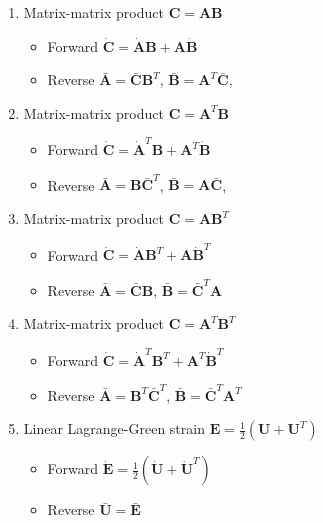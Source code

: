 \documentclass{article}
\begin{document}
\begin{enumerate}

\item Matrix-matrix product $\mathbf{C} = \mathbf{A} \mathbf{B}$
\begin{itemize}
\item Forward $\dot{\mathbf{C}} = \dot{\mathbf{A}} \mathbf{B} + \mathbf{A} \dot{\mathbf{B}}$
\item Reverse $\bar{\mathbf{A}} = \bar{\mathbf{C}} \mathbf{B}^{T}$,  $\bar{\mathbf{B}} = \mathbf{A}^{T} \bar{\mathbf{C}}$,
\end{itemize}

\item Matrix-matrix product $\mathbf{C} = \mathbf{A}^{T} \mathbf{B}$
\begin{itemize}
\item Forward $\dot{\mathbf{C}} = \dot{\mathbf{A}}^{T} \mathbf{B} + \mathbf{A}^{T} \dot{\mathbf{B}}$
\item Reverse $\bar{\mathbf{A}} = \mathbf{B} \bar{\mathbf{C}}^{T}$,  $\bar{\mathbf{B}} = \mathbf{A} \bar{\mathbf{C}}$,
\end{itemize}

\item Matrix-matrix product $\mathbf{C} = \mathbf{A} \mathbf{B}^{T}$
\begin{itemize}
\item Forward $\dot{\mathbf{C}} = \dot{\mathbf{A}} \mathbf{B}^{T} + \mathbf{A} \dot{\mathbf{B}}^{T}$
\item Reverse $\bar{\mathbf{A}} = \bar{\mathbf{C}} \mathbf{B}$, $\bar{\mathbf{B}} = \bar{\mathbf{C}}^{T} \mathbf{A}$
\end{itemize}

\item Matrix-matrix product $\mathbf{C} = \mathbf{A}^{T} \mathbf{B}^{T}$
\begin{itemize}
\item Forward $\dot{\mathbf{C}} = \dot{\mathbf{A}}^{T} \mathbf{B}^{T} + \mathbf{A}^{T} \dot{\mathbf{B}}^{T}$
\item Reverse $\bar{\mathbf{A}} = \mathbf{B}^{T} \bar{\mathbf{C}}^{T} $, $\bar{\mathbf{B}} = \bar{\mathbf{C}}^{T} \mathbf{A}^{T}$
\end{itemize}

\item Linear Lagrange-Green strain $\mathbf{E} = \frac{1}{2} \left( \mathbf{U} + \mathbf{U}^{T} \right)$
\begin{itemize}
\item Forward $\dot{\mathbf{E}} = \frac{1}{2} \left( \dot{\mathbf{U}} + \dot{\mathbf{U}}^{T} \right)$
\item Reverse $\bar{\mathbf{U}} = \bar{\mathbf{E}}$
\end{itemize}


\end{enumerate}
\end{document}
